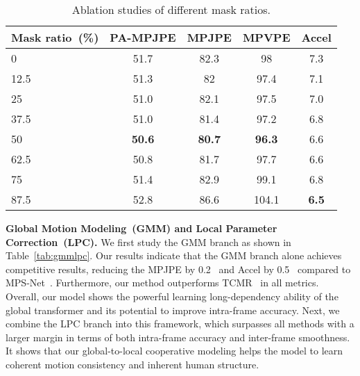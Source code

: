 \documentclass[10pt,twocolumn,letterpaper]{article}
\begin{document}
		\begin{table}[t]
			\small
			\centering
			\setlength\tabcolsep{4pt}
			\def\arraystretch{1.0}
			
\begin{tabular}{l|cccc}
					\toprule[2pt]
					Mask ratio~(\%) & PA-MPJPE & MPJPE & MPVPE & Accel \\
					\midrule[1pt]
					0 & 51.7 & 82.3 & 98 & 7.3  \\
					
					\cellcolor{Gray}12.5 &\cellcolor{Gray}51.3 & \cellcolor{Gray}82& \cellcolor{Gray}97.4& \cellcolor{Gray}7.1 \\
					
					25& 51.0 & 82.1 & 97.5 & 7.0  \\
					
					\cellcolor{Gray}37.5 & \cellcolor{Gray}51.0 & \cellcolor{Gray}81.4 & \cellcolor{Gray}97.2 & \cellcolor{Gray}6.8  \\
					
					50   & \textbf{50.6} & \textbf{80.7} &  \textbf{96.3} &  6.6 \\ 
					
					\cellcolor{Gray}62.5& \cellcolor{Gray}50.8 & \cellcolor{Gray}81.7 & \cellcolor{Gray}97.7 & \cellcolor{Gray}6.6 \\
					
					75  &51.4 & 82.9 & 99.1 & 6.8 \\
					
					\cellcolor{Gray}87.5  & \cellcolor{Gray}52.8 & \cellcolor{Gray}86.6 & \cellcolor{Gray}104.1 & \cellcolor{Gray}\textbf{6.5} \\
					\bottomrule[1pt]
				\end{tabular}
\vspace*{-0.5 em}
			\caption{Ablation studies of different mask ratios.}
			\vspace{-0.5 em}
			\label{table:mask_ratio}
		\end{table}
		
		\noindent\textbf{Global Motion Modeling~(GMM) and Local Parameter Correction~(LPC).}
		We first study the GMM branch as shown in Table~\ref{tab:gmmlpc}. Our results indicate that the GMM branch alone achieves competitive results, reducing the MPJPE by 0.2~  and Accel by 0.5~ compared to MPS-Net~\cite{MPS-net}. Furthermore, our method outperforms TCMR~\cite{TCMR} in all metrics. Overall, our model shows the powerful learning long-dependency ability of the global transformer and its potential to improve intra-frame accuracy.
		Next, we combine the LPC branch into this framework, which surpasses all methods with a larger margin in terms of both intra-frame accuracy and inter-frame smoothness. It shows that our global-to-local cooperative modeling helps the model to learn coherent motion consistency and inherent human structure.
		
\end{document}
